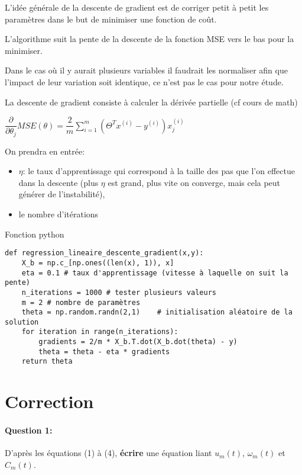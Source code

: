 L'idée générale de la descente de gradient est de corriger petit à petit les paramètres dans le but de minimiser une fonction de coût.

L'algorithme suit la pente de la descente de la fonction MSE vers le bas pour la minimiser.

Dans le cas où il y aurait plusieurs variables il faudrait les normaliser afin que l'impact de leur variation soit identique, ce n'est pas le cas pour notre étude.

La descente de gradient consiste à calculer la dérivée partielle (cf cours de math)
\begin{center}
$\dfrac{\partial}{\partial \theta_j}MSE(\theta)=\dfrac{2}{m}\sum\limits_{i=1}^m (\Theta^T x^{(i)}-y^{(i)})x_j^{(i)}$
\end{center}

On prendra en entrée:
\begin{itemize}
 \item $\eta$: le taux d'apprentissage qui correspond à la taille des pas que l'on effectue dans la descente (plus $\eta$ est grand, plus vite on converge, mais cela peut générer de l'instabilité),
 \item le nombre d'itérations
\end{itemize}

Fonction python
\begin{lstlisting}
def regression_lineaire_descente_gradient(x,y):
    X_b = np.c_[np.ones((len(x), 1)), x]
    eta = 0.1 # taux d'apprentissage (vitesse à laquelle on suit la pente)
    n_iterations = 1000 # tester plusieurs valeurs
    m = 2 # nombre de paramètres
    theta = np.random.randn(2,1)    # initialisation aléatoire de la solution
    for iteration in range(n_iterations):
        gradients = 2/m * X_b.T.dot(X_b.dot(theta) - y)
        theta = theta - eta * gradients
    return theta
\end{lstlisting}

\ifdef{\public}{}{}

\clearpage

\newpage

\pagestyle{correction}

\section{Correction}

\paragraph{Question 1:} D'après les équations (1) à (4), \textbf{écrire} une équation liant $u_m(t)$, $\omega_m(t)$ et $C_m(t)$.

